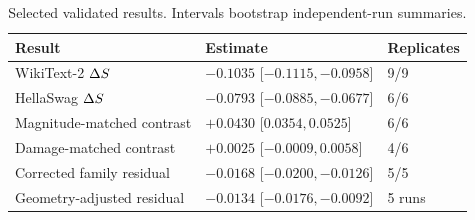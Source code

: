 \begin{table}[t]
\centering
\scriptsize
\caption{Selected validated results. Intervals bootstrap independent-run summaries.}
\begin{tabular}{@{}p{}p{}p{}@{}}
\toprule
Result & Estimate & Replicates \\
\midrule
WikiText-2 $\Delta S$ & $-0.1035$ [$-0.1115,-0.0958$] & 9/9 \\
HellaSwag $\Delta S$ & $-0.0793$ [$-0.0885,-0.0677$] & 6/6 \\
Magnitude-matched contrast & $+0.0430$ [$0.0354,0.0525$] & 6/6 \\
Damage-matched contrast & $+0.0025$ [$-0.0009,0.0058$] & 4/6 \\
Corrected family residual & $-0.0168$ [$-0.0200,-0.0126$] & 5/5 \\
Geometry-adjusted residual & $-0.0134$ [$-0.0176,-0.0092$] & 5 runs \\
\bottomrule
\end{tabular}
\label{tab:key-results}
\end{table}

